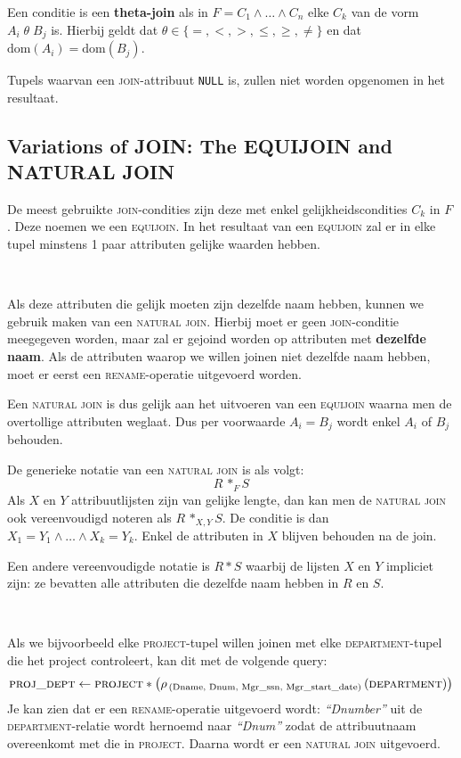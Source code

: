Een conditie is een \textbf{theta-join} als in $F = C_1 \wedge \dots \wedge C_n$ elke $C_k$ van de vorm $A_i \; \theta \; B_j$ is. Hierbij geldt dat $\theta \in \{=, <, >, \leqslant, \geqslant, \neq \}$ en dat $\text{dom}(A_i) = \text{dom}(B_j)$.

Tupels waarvan een \textsc{join}-attribuut \texttt{NULL} is, zullen niet worden opgenomen in het resultaat.


\subsection{Variations of JOIN: The EQUIJOIN and NATURAL JOIN}
De meest gebruikte \textsc{join}-condities zijn deze met enkel gelijkheidscondities $C_k$ in $F$. Deze noemen we een \textsc{equijoin}. In het resultaat van een \textsc{equijoin} zal er in elke tupel minstens 1 paar attributen gelijke waarden hebben.

~

\noindent Als deze attributen die gelijk moeten zijn dezelfde naam hebben, kunnen we gebruik maken van een \textsc{natural join}. Hierbij moet er geen \textsc{join}-conditie meegegeven worden, maar zal er gejoind worden op attributen met \textbf{dezelfde naam}. Als de attributen waarop we willen joinen niet dezelfde naam hebben, moet er eerst een \textsc{rename}-operatie uitgevoerd worden.

Een \textsc{natural join} is dus gelijk aan het uitvoeren van een \textsc{equijoin} waarna men de overtollige attributen weglaat. Dus per voorwaarde $A_i = B_j$ wordt enkel $A_i$ of $B_j$ behouden.

De generieke notatie van een \textsc{natural join} is als volgt:
\vspace{-2mm}
\[ R \,*_F S \]
Als $X$ en $Y$ attribuutlijsten zijn van gelijke lengte, dan kan men de \textsc{natural join} ook vereenvoudigd noteren als $R \,*_{X,Y} S$. De conditie is dan $X_1 = Y_1 \wedge \dots \wedge X_k = Y_k$. Enkel de attributen in $X$ blijven behouden na de join.

Een andere vereenvoudigde notatie is $R * S$ waarbij de lijsten $X$ en $Y$ impliciet zijn: ze bevatten alle attributen die dezelfde naam hebben in $R$ en $S$.

~

\noindent Als we bijvoorbeeld elke \textsc{project}-tupel willen joinen met elke \textsc{department}-tupel die het project controleert, kan dit met de volgende query:
\vspace{-2mm}
\[ \textsc{proj\_dept} \leftarrow \textsc{project} * \left(\rho_{\,\text{(Dname, Dnum, Mgr\_ssn, Mgr\_start\_date)}} \left( \textsc{department} \right) \right) \]
Je kan zien dat er een \textsc{rename}-operatie uitgevoerd wordt: \textit{``Dnumber''} uit de \textsc{department}-relatie wordt hernoemd naar \textit{``Dnum''} zodat de attribuutnaam overeenkomt met die in \textsc{project}. Daarna wordt er een \textsc{natural join} uitgevoerd.

